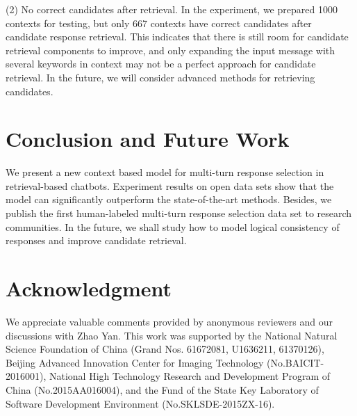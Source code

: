 \documentclass[11pt,a4paper]{article}
\begin{document}
	(2) No correct candidates after retrieval. In the experiment, we prepared 1000 contexts for testing, but only 667 contexts have correct candidates after candidate response retrieval. This indicates that there is still room for candidate retrieval components to improve, and only expanding the input message with several keywords in context may not be a perfect approach for candidate retrieval. In the future, we will consider advanced methods for retrieving candidates.
	
	\section{Conclusion and Future Work}
	We present a new context based model for multi-turn response selection in retrieval-based chatbots. Experiment results on open data sets show that the model can significantly outperform the state-of-the-art methods. Besides, we publish the first human-labeled multi-turn response selection data set to research communities. In the future, we shall study how to model logical consistency of responses and improve candidate retrieval.
	
	
	
		\section{Acknowledgment}
	We appreciate valuable comments provided by anonymous reviewers and our discussions with Zhao Yan.
	This work was supported by the National Natural Science Foundation of China (Grand Nos. 61672081, U1636211, 61370126), Beijing Advanced Innovation Center for Imaging Technology (No.BAICIT-2016001), National High Technology Research and Development Program of China (No.2015AA016004), and the Fund of the State Key Laboratory of Software Development Environment (No.SKLSDE-2015ZX-16).

	
\end{document}
